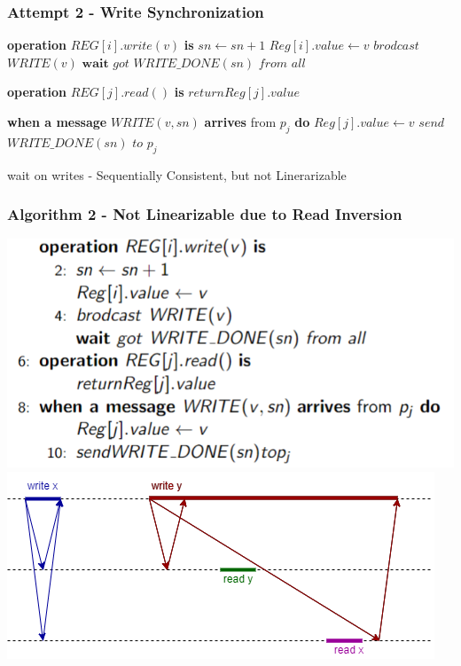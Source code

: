 \begin{frame}[fragile]
    \frametitle{Attempt 2 - Write Synchronization}
    \begin{algorithm}[H]
        \begin{algorithmic}[0]
            \STATE \textbf{operation} $REG[i].write(v)$ \textbf{is}
            \bindent
                \STATE $sn\leftarrow sn+1$
                \STATE $Reg[i].value \leftarrow v$
                \STATE $brodcast$ $WRITE(v)$
                \STATE $\textbf{wait}$ $got$ $WRITE\_DONE(sn)$ $from$ $all$
            \eindent

            \STATE \textbf{operation} $REG[j].read()$ \textbf{is}
            \bindent
                \STATE $return Reg[j].value$
            \eindent
            
            \STATE \textbf{when a message} $WRITE(v, sn)$ \textbf{arrives} from $p_j$ \textbf{do}
            \bindent
                \STATE $Reg[j].value \leftarrow v$
                \STATE $send$ $WRITE\_DONE(sn)$ $to$ $p_j$
            \eindent

        \end{algorithmic}
        \caption{wait on writes - Sequentially Consistent, but not Linerarizable}
        \label{alg:seq}
    \end{algorithm}
\end{frame}

\begin{frame}
    \frametitle{Algorithm 2 - Not Linearizable due to Read Inversion}
    \begin{center}
        \includegraphics[scale=.63]{alg2_src.png}
        \includegraphics[scale=.5]{alg2_incorrectness.png}
    \end{center}
\end{frame}

